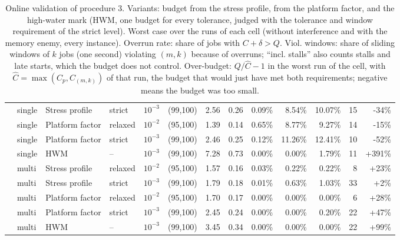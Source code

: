 \begin{table}[ht]
{\begin{tabular}{llllrrrrrrrrr}
 & single & Stress profile & strict & $10^{-3}$ & (99,100) & 2.56 & 0.26 & 0.09\% & 8.54\% & 10.07\% & 15 & -34\% \\
 & single & Platform factor & relaxed & $10^{-2}$ & (95,100) & 1.39 & 0.14 & 0.65\% & 8.77\% & 9.27\% & 14 & -15\% \\
 & single & Platform factor & strict & $10^{-3}$ & (99,100) & 2.46 & 0.25 & 0.12\% & 11.26\% & 12.41\% & 10 & -52\% \\
 & single & HWM & -- & $10^{-3}$ & (99,100) & 7.28 & 0.73 & 0.00\% & 0.00\% & 1.79\% & 11 & +391\% \\
 & multi & Stress profile & relaxed & $10^{-2}$ & (95,100) & 1.57 & 0.16 & 0.03\% & 0.22\% & 0.22\% & 8 & +23\% \\
 & multi & Stress profile & strict & $10^{-3}$ & (99,100) & 1.79 & 0.18 & 0.01\% & 0.63\% & 1.03\% & 33 & +2\% \\
 & multi & Platform factor & relaxed & $10^{-2}$ & (95,100) & 1.70 & 0.17 & 0.00\% & 0.00\% & 0.00\% & 6 & +28\% \\
 & multi & Platform factor & strict & $10^{-3}$ & (99,100) & 2.45 & 0.24 & 0.00\% & 0.00\% & 0.20\% & 22 & +47\% \\
 & multi & HWM & -- & $10^{-3}$ & (99,100) & 3.45 & 0.34 & 0.00\% & 0.00\% & 0.00\% & 22 & +99\% \\
\bottomrule
\end{tabular}}
\caption{Online validation of procedure 3. Variants: budget from the stress profile, from the platform factor, and the high-water mark (HWM, one budget for every tolerance, judged with the tolerance and window requirement of the strict level). Worst case over the runs of each cell (without interference and with the memory enemy, every instance). Overrun rate: share of jobs with $C+\delta>Q$. Viol. windows: share of sliding windows of $k$ jobs (one second) violating $(m,k)$ because of overruns; ``incl. stalls'' also counts stalls and late starts, which the budget does not control. Over-budget: $Q/\hat C-1$ in the worst run of the cell, with $\hat C=\max(C_p,C_{(m,k)})$ of that run, the budget that would just have met both requirements; negative means the budget was too small.}
\label{tab:p3-results-table}
\end{table}

